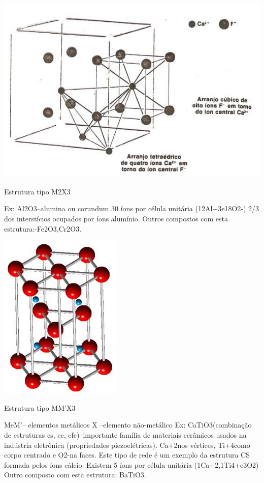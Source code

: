 \includegraphics[scale=0.3,trim={0 0 0 0}]{figures/CaF2}

Estrutura tipo M2X3

Ex: Al2O3–alumina ou corundum
30 íons por célula unitária (12Al+3e18O2-)
2/3 dos interstícios ocupados por íons alumínio.
Outros compostos com esta estrutura:-Fe2O3,Cr2O3.
  
\includegraphics[scale=0.5,trim={0 0 0 0}]{figures/Al2O3}

Estrutura tipo MM'X3

 MeM'– elementos metálicos
 X –elemento não-metálico
 Ex: CaTiO3(combinação de estruturas cs, cc, cfc)–importante família de materiais cerâmicos usados na indústria eletrônica (propriedades piezoelétricas).
 Ca+2nos vértices, Ti+4como corpo centrado e O2-na faces.
 Este tipo de rede é um exemplo da estrutura CS formada pelos íons cálcio.
 Existem 5 íons por célula unitária (1Ca+2,1Ti4+e3O2)
 Outro composto com esta estrutura: BaTiO3.
 
